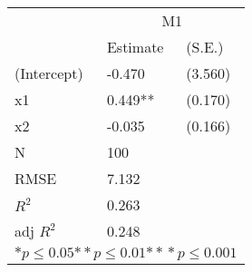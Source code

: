 \begin{tabular}{*{3}{l}}
\hline
                  & \multicolumn{2}{c}{M1}   \tabularnewline
                   &Estimate  &(S.E.)  \tabularnewline
 \hline
 \hline
   (Intercept)     &-0.470   &   (3.560) \tabularnewline
   x1              &0.449**   &   (0.170) \tabularnewline
   x2              &-0.035   &   (0.166) \tabularnewline
 \hline
 N                 &100       &        \tabularnewline
 RMSE             &7.132         & \tabularnewline
 $R^2$             &0.263         & \tabularnewline
 adj $R^2$         &0.248         & \tabularnewline
 \hline
\hline
 
 \multicolumn{3}{c}{${*  p}\le 0.05$${*\!\!*  p}\le 0.01$${*\!\!*\!\!*  p}\le 0.001$}\tabularnewline
 \end{tabular}